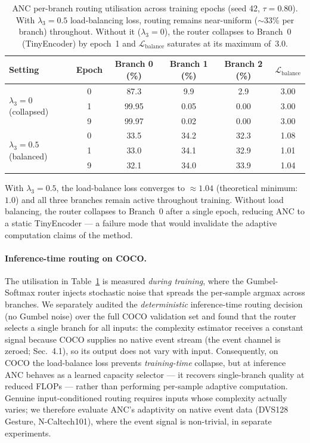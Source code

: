 \documentclass{article}
\begin{document}
\begin{table}[htbp]
\centering
\caption{ANC per-branch routing utilisation across training epochs (seed 42, $\tau{=}0.80$). With $\lambda_3{=}0.5$ load-balancing loss, routing remains near-uniform ($\sim$33\% per branch) throughout. Without it ($\lambda_3{=}0$), the router collapses to Branch~0 (TinyEncoder) by epoch~1 and $\mathcal{L}_{\text{balance}}$ saturates at its maximum of~3.0.}
\label{tab:anc_routing}
\begin{tabular}{lccccc}
\toprule
Setting & Epoch & Branch 0 (\%) & Branch 1 (\%) & Branch 2 (\%) & $\mathcal{L}_{\text{balance}}$ \\
\midrule
\multirow{3}{*}{$\lambda_3=0$ (collapsed)} & 0 & 87.3 & 9.9 & 2.9 & 3.00 \\
 & 1 & 99.95 & 0.05 & 0.00 & 3.00 \\
 & 9 & 99.97 & 0.02 & 0.00 & 3.00 \\
\midrule
\multirow{3}{*}{$\lambda_3=0.5$ (balanced)} & 0 & 33.5 & 34.2 & 32.3 & 1.08 \\
 & 1 & 33.0 & 34.1 & 32.9 & 1.01 \\
 & 9 & 32.1 & 34.0 & 33.9 & 1.04 \\
\bottomrule
\end{tabular}
\end{table}

With $\lambda_3{=}0.5$, the load-balance loss converges to $\approx 1.04$ (theoretical minimum: $1.0$) and all three branches remain active throughout training.
Without load balancing, the router collapses to Branch~0 after a single epoch, reducing ANC to a static TinyEncoder --- a failure mode that would invalidate the adaptive computation claims of the method.

\paragraph{Inference-time routing on COCO.}
The utilisation in Table~\ref{tab:anc_routing} is measured \emph{during training}, where the Gumbel-Softmax router injects stochastic noise that spreads the per-sample argmax across branches. We separately audited the \emph{deterministic} inference-time routing decision (no Gumbel noise) over the full COCO validation set and found that the router selects a single branch for all inputs: the complexity estimator receives a constant signal because COCO supplies no native event stream (the event channel is zeroed; Sec.~4.1), so its output does not vary with input. Consequently, on COCO the load-balance loss prevents \emph{training-time} collapse, but at inference ANC behaves as a learned capacity selector --- it recovers single-branch quality at reduced FLOPs --- rather than performing per-sample adaptive computation. Genuine input-conditioned routing requires inputs whose complexity actually varies; we therefore evaluate ANC's adaptivity on native event data (DVS128 Gesture, N-Caltech101), where the event signal is non-trivial, in separate experiments.
\end{document}
